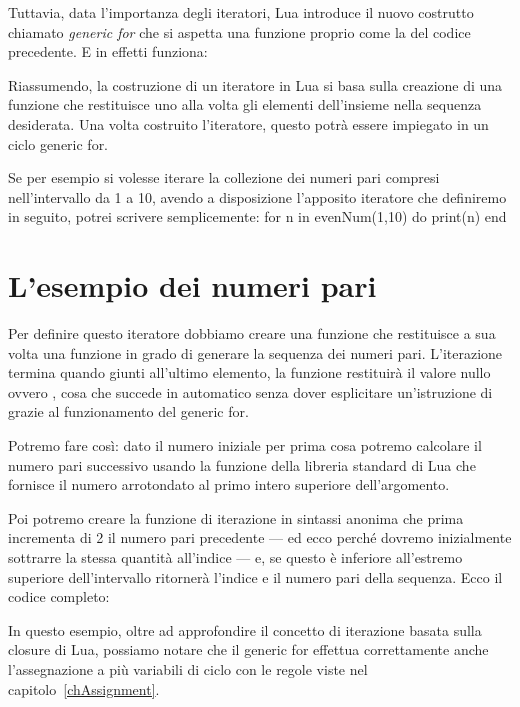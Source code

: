 Tuttavia, data l'importanza degli iteratori, Lua introduce il nuovo costrutto
chiamato \emph{generic for} che si aspetta una funzione proprio come la
 del codice precedente. E in effetti funziona:

Riassumendo, la costruzione di un iteratore in Lua si basa sulla creazione di
una funzione che restituisce uno alla volta gli elementi dell'insieme nella
sequenza desiderata. Una volta costruito l'iteratore, questo potrà essere
impiegato in un ciclo generic for.

Se per esempio si volesse iterare la collezione dei numeri pari compresi
nell'intervallo da 1 a 10, avendo a disposizione l'apposito iteratore
 che definiremo in seguito, potrei scrivere semplicemente:
\lines
for n in evenNum(1,10) do
    print(n)
end
\endlines
{}


\section{L'esempio dei numeri pari}

Per definire questo iteratore dobbiamo creare una funzione che restituisce a
sua volta una funzione in grado di generare la sequenza dei numeri pari.
L'iterazione termina quando giunti all'ultimo elemento, la funzione restituirà
il valore nullo ovvero , cosa che succede in automatico senza dover
esplicitare un'istruzione di  grazie al funzionamento del generic
for.

Potremo fare così: dato il numero iniziale per prima cosa potremo calcolare il
numero pari successivo usando la funzione della libreria standard di Lua
 che fornisce il numero arrotondato al primo intero superiore
dell'argomento.

Poi potremo creare la funzione di iterazione in sintassi anonima che prima
incrementa di 2 il numero pari precedente --- ed ecco perché dovremo
inizialmente sottrarre la stessa quantità all'indice --- e, se questo è
inferiore all'estremo superiore dell'intervallo ritornerà l'indice e il numero
pari della sequenza. Ecco il codice completo:

In questo esempio, oltre ad approfondire il concetto di iterazione basata sulla
closure di Lua, possiamo notare che il generic for effettua correttamente anche
l'assegnazione a più variabili di ciclo con le regole viste nel
capitolo~\ref{chAssignment}.

